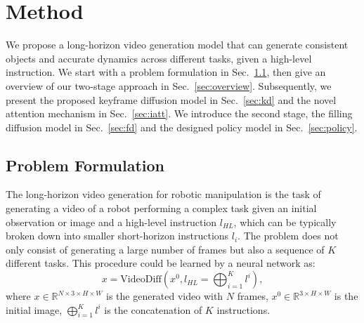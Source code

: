 \documentclass[letterpaper, 10 pt, conference]{ieeeconf}  %
\begin{document}

\section{Method}

We propose a long-horizon video generation model that can generate consistent objects and accurate dynamics across different tasks, given a high-level instruction. We start with a problem formulation in Sec.~\ref{sec:problem}, then give an overview of our two-stage approach in Sec.~\ref{sec:overview}. Subsequently, we present the proposed keyframe diffusion model in Sec.~\ref{sec:kd} and the novel attention mechanism in Sec.~\ref{sec:iatt}. We introduce the second stage, the filling diffusion model in Sec.~\ref{sec:fd} and the designed policy model in Sec.~\ref{sec:policy}.


\subsection{Problem Formulation}
\label{sec:problem}
The long-horizon video generation for robotic manipulation is the task of generating a video of a robot performing a complex task given an initial observation or image and a high-level instruction $l_{HL}$, which can be typically broken down into smaller short-horizon instructions $l_i$. The problem does not only consist of generating a large number of frames but also a sequence of $K$ different tasks. This procedure could be learned by a neural network as: 
\begin{equation}
    x= \textrm{VideoDiff}(x^0, l_{HL}=\bigoplus_{i=1}^{K} l^i ),
\end{equation}
where $x \in \mathbb{R}^{ N \times 3 \times H \times W}  $ is the generated video with $N$ frames, $x^0 \in \mathbb{R}^{ 3 \times H \times W}$ is the initial image, $\bigoplus_{i=1}^{K} l^i$ is the concatenation of $K$ instructions. 

\end{document}
